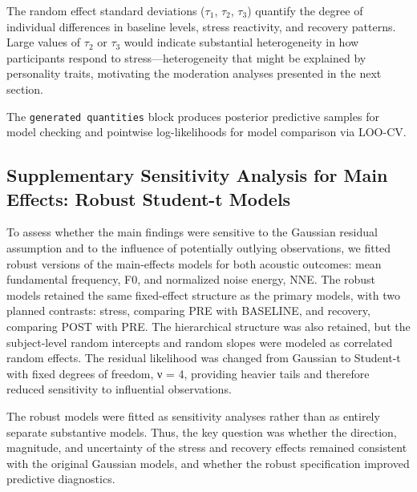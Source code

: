 \documentclass[
  english,
  man,floatsintext]{apa6}
\begin{document}
The random effect standard deviations (\(\tau_1\), \(\tau_2\), \(\tau_3\)) quantify the degree of individual differences in baseline levels, stress reactivity, and recovery patterns. Large values of \(\tau_2\) or \(\tau_3\) would indicate substantial heterogeneity in how participants respond to stress---heterogeneity that might be explained by personality traits, motivating the moderation analyses presented in the next section.

The \texttt{generated\ quantities} block produces posterior predictive samples for model checking and pointwise log-likelihoods for model comparison via LOO-CV.

\subsection{Supplementary Sensitivity Analysis for Main Effects: Robust Student-t Models}\label{supplementary-sensitivity-analysis-for-main-effects-robust-student-t-models}

To assess whether the main findings were sensitive to the Gaussian residual assumption and to the influence of potentially outlying observations, we fitted robust versions of the main-effects models for both acoustic outcomes: mean fundamental frequency, F0, and normalized noise energy, NNE. The robust models retained the same fixed-effect structure as the primary models, with two planned contrasts: stress, comparing PRE with BASELINE, and recovery, comparing POST with PRE. The hierarchical structure was also retained, but the subject-level random intercepts and random slopes were modeled as correlated random effects. The residual likelihood was changed from Gaussian to Student-t with fixed degrees of freedom, ν = 4, providing heavier tails and therefore reduced sensitivity to influential observations.

The robust models were fitted as sensitivity analyses rather than as entirely separate substantive models. Thus, the key question was whether the direction, magnitude, and uncertainty of the stress and recovery effects remained consistent with the original Gaussian models, and whether the robust specification improved predictive diagnostics.
\end{document}
